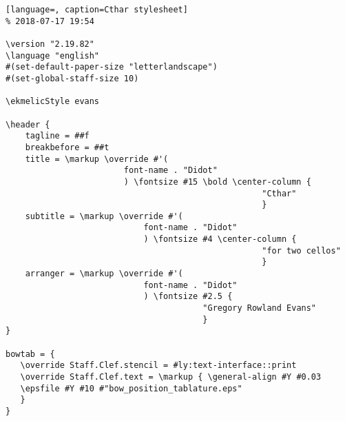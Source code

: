 \singlespace
\begin{lstlisting}[language=, caption=Cthar stylesheet]
% 2018-07-17 19:54

\version "2.19.82"
\language "english"
#(set-default-paper-size "letterlandscape")
#(set-global-staff-size 10)

\ekmelicStyle evans

\header {
	tagline = ##f
	breakbefore = ##t
	title = \markup \override #'(
						font-name . "Didot"
						) \fontsize #15 \bold \center-column {
													"Cthar"
													}
	subtitle = \markup \override #'(
							font-name . "Didot"
							) \fontsize #4 \center-column {
													"for two cellos"
													}
	arranger = \markup \override #'(
							font-name . "Didot"
							) \fontsize #2.5 {
										"Gregory Rowland Evans"
										}
}

bowtab = {
   \override Staff.Clef.stencil = #ly:text-interface::print
   \override Staff.Clef.text = \markup { \general-align #Y #0.03
   \epsfile #Y #10 #"bow_position_tablature.eps"
   }
}


\end{lstlisting}
